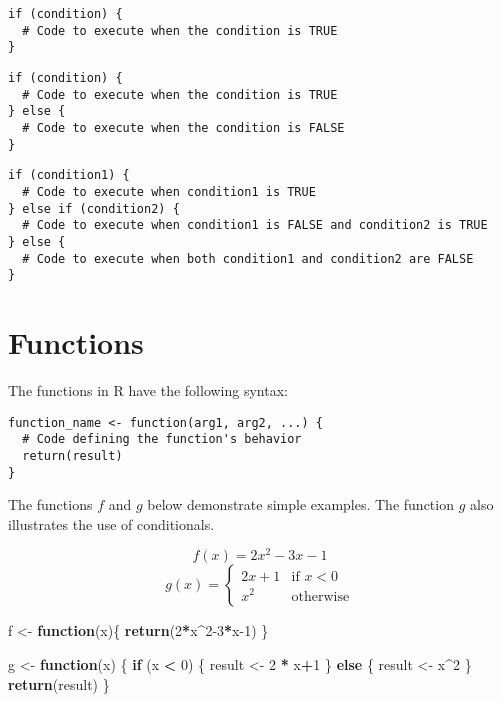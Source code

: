 \documentclass[
]{book}
\newenvironment{Shaded}{\begin{snugshade}}{\end{snugshade}}
\newcommand{\ControlFlowTok}[1]{\textcolor[rgb]{0.13,0.29,0.53}{\textbf{#1}}}
\newcommand{\DecValTok}[1]{\textcolor[rgb]{0.00,0.00,0.81}{#1}}
\newcommand{\FunctionTok}[1]{\textcolor[rgb]{0.13,0.29,0.53}{\textbf{#1}}}
\newcommand{\NormalTok}[1]{#1}
\newcommand{\OtherTok}[1]{\textcolor[rgb]{0.56,0.35,0.01}{#1}}
\newcommand{\SpecialCharTok}[1]{\textcolor[rgb]{0.81,0.36,0.00}{\textbf{#1}}}
\theoremstyle{definition}
\theoremstyle{definition}
\theoremstyle{definition}
\theoremstyle{definition}
\theoremstyle{remark}
\begin{document}
\begin{verbatim}
if (condition) {
  # Code to execute when the condition is TRUE
}
\end{verbatim}

\begin{verbatim}
if (condition) {
  # Code to execute when the condition is TRUE
} else {
  # Code to execute when the condition is FALSE
}
\end{verbatim}

\begin{verbatim}
if (condition1) {
  # Code to execute when condition1 is TRUE
} else if (condition2) {
  # Code to execute when condition1 is FALSE and condition2 is TRUE
} else {
  # Code to execute when both condition1 and condition2 are FALSE
}
\end{verbatim}

\hypertarget{functions}{%
\section{Functions}\label{functions}}

The functions in R have the following syntax:

\begin{verbatim}
function_name <- function(arg1, arg2, ...) {
  # Code defining the function's behavior
  return(result)
}
\end{verbatim}

The functions \(f\) and \(g\) below demonstrate simple examples. The function \(g\) also illustrates the use of conditionals.

\[f(x)=2x^2-3x-1\]
\[g(x)=\begin{cases}2x+1&\text{if }x<0\\x^2 &\text{otherwise} \end{cases}\]

\begin{Shaded}
\begin{Highlighting}[]
\NormalTok{f }\OtherTok{\textless{}{-}} \ControlFlowTok{function}\NormalTok{(x)\{}
  \FunctionTok{return}\NormalTok{(}\DecValTok{2}\SpecialCharTok{*}\NormalTok{x}\SpecialCharTok{\^{}}\DecValTok{2{-}3}\SpecialCharTok{*}\NormalTok{x}\DecValTok{{-}1}\NormalTok{)}
\NormalTok{\}}

\NormalTok{g }\OtherTok{\textless{}{-}} \ControlFlowTok{function}\NormalTok{(x) \{}
  \ControlFlowTok{if}\NormalTok{ (x }\SpecialCharTok{\textless{}} \DecValTok{0}\NormalTok{) \{}
\NormalTok{    result }\OtherTok{\textless{}{-}} \DecValTok{2} \SpecialCharTok{*}\NormalTok{ x}\SpecialCharTok{+}\DecValTok{1}
\NormalTok{  \} }\ControlFlowTok{else}\NormalTok{ \{}
\NormalTok{    result }\OtherTok{\textless{}{-}}\NormalTok{ x}\SpecialCharTok{\^{}}\DecValTok{2}
\NormalTok{  \}}
  \FunctionTok{return}\NormalTok{(result)}
\NormalTok{\}}
\end{Highlighting}
\end{Shaded}
\end{document}
